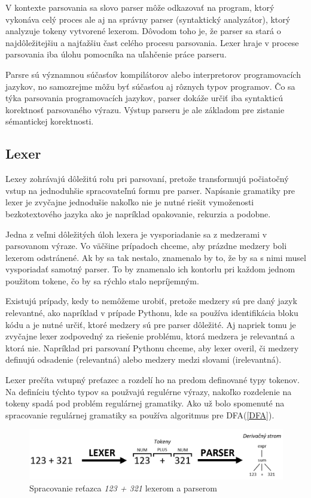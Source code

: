 V kontexte parsovania sa slovo parser môže odkazovať na program, ktorý vykonáva celý proces ale aj na správny parser (syntaktický analyzátor), ktorý analyzuje tokeny vytvorené lexerom. Dôvodom toho je, že parser sa stará o najdôležitejšiu a najťažšiu čast celého procesu parsovania. Lexer hraje v procese parsovania iba úlohu pomocníka na uľahčenie práce parseru.

Parsre sú významnou súčasťov kompilátorov alebo interpretorov programovacích jazykov, no samozrejme môžu byť súčasťou aj rôznych typov programov. Čo sa týka parsovania programovacích jazykov, parser dokáže určiť iba syntakticú korektnosť parsovaného výrazu. Výstup parseru je ale základom pre zistanie sémantickej korektnosti.

\subsection{Lexer}\label{lexer}
Lexey zohrávajú dôležitú  rolu pri parsovaní, pretože transformujú počiatočný vstup na jednoduhšie spracovateľnú formu pre parser. Napísanie gramatiky pre lexer je zvyčajne jednodušie nakoľko nie je nutné riešit vymoženosti bezkotextového jazyka ako je napríklad opakovanie, rekurzia a podobne.

Jedna z veľmi dôležitých úloh lexera je vysporiadanie sa z medzerami v parsovanom výraze. Vo väčšine prípadoch chceme, aby prázdne medzery boli lexerom odstránené. Ak by sa tak nestalo, znamenalo by to, že by sa s nimi musel vysporiadať samotný parser. To by znamenalo ich kontorlu pri každom jednom použitom tokene, čo by sa rýchlo stalo nepríjemným.

Existujú prípady, kedy to nemôžeme urobiť, pretože medzery sú pre daný jazyk relevantné, ako napríklad v prípade Pythonu, kde sa používa identifikácia bloku kódu a je nutné určiť, ktoré medzery sú pre parser dôležité. Aj napriek tomu je zvyčajne lexer zodpovedný za riešenie problému, ktorá medzera je relevantná a ktorá nie. Napríklad pri parsovaní Pythonu chceme, aby lexer overil, či medzery definujú odsadenie (relevantná) alebo medzery medzi slovami (irelevantná). \cite{tomassetti:parsing}

Lexer prečíta vstupný preťazec a rozdelí ho na predom definované typy tokenov. Na definíciu týchto typov sa použvajú regulérne výrazy, nakoľko rozdelenie na tokeny spadá pod problém regulárnej gramatiky. Ako už bolo spomenuté na spracovanie regulárnej gramatiky sa používa algoritmus pre DFA(\ref{DFA}).

\begin{figure}[H]
\begin{center}
\includegraphics[width=14cm]{figures/lexer_parser.PNG}
\caption{Spracovanie reťazca \textit{123 + 321} lexerom a parserom}
\label{fig:lexer_parser}
\end{center}
\end{figure}

